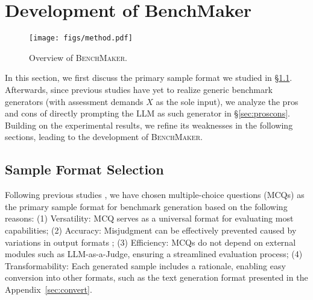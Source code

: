 \section{Development of BenchMaker}
\label{submission}

\begin{figure*}[h]
\centering
\texttt{[image: figs/method.pdf]}
\caption{Overview of \textsc{BenchMaker}.}
\label{fig:method}
\end{figure*}

In this section, we first discuss the primary sample format we studied in \S\ref{sec:sampleformat}.
Afterwards, since previous studies have yet to realize generic benchmark generators (with assessment demands $X$ as the sole input), we analyze the pros and cons of directly prompting the LLM as such generator in \S\ref{sec:proscons}. Building on the experimental results, we refine its weaknesses in the following sections, leading to the development of \textsc{BenchMaker}.

\subsection{Sample Format Selection}
\label{sec:sampleformat}
Following previous studies \citep{perteval,dyval2}, we have chosen multiple-choice questions (MCQs) as the primary sample format for benchmark generation based on the following reasons: (1) Versatility: MCQ serves as a universal format for evaluating most capabilities; (2) Accuracy: Misjudgment can be effectively prevented caused by variations in output formats \citep{format}; (3) Efficiency: MCQs do not depend on external modules such as LLM-as-a-Judge, ensuring a streamlined evaluation process; (4) Transformability: Each generated sample includes a rationale, enabling easy conversion into other formats, such as the text generation format presented in the Appendix~\ref{sec:convert}.

